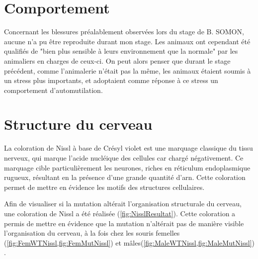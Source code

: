 \section{Comportement}
\label{sec:Comportement}
Concernant les blessures préalablement observées lors du stage de B. SOMON, aucune n'a pu être reproduite durant mon stage. Les animaux ont cependant été qualifiés de "bien plus sensible à leurs environnement que la normale" par les animaliers en charges de ceux-ci. On peut alors penser que durant le stage précédent, comme l'animalerie n'était pas la même, les animaux étaient soumis à un stress plus importants, et adoptaient comme réponse à ce stress un comportement d'automutilation. 

\section{Structure du cerveau}
\label{sec:NisslResultat}
La coloration de Nissl à base de Crésyl violet est une marquage classique du tissu nerveux, qui marque l'acide nucléique des cellules car chargé négativement. Ce marquage cible particulièrement les neurones, riches en réticulum endoplasmique rugueux, résultant en la présence d'une grande quantité d'\acrshort{arn}. Cette coloration permet de mettre en évidence les motifs des structures cellulaires.

Afin de visualiser si la mutation \mcrd altérait l'organisation structurale du cerveau, une coloration de Nissl a été réalisée (\cref{fig:NisslResultat}). Cette coloration a permis de mettre en évidence que la mutation n'altérait pas de manière visible l'organisation du cerveau, à la fois chez les souris femelles (\cref{fig:FemWTNissl,fig:FemMutNissl}) et mâles(\cref{fig:MaleWTNissl,fig:MaleMutNissl}) .

